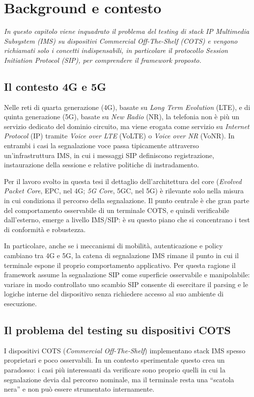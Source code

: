 \chapter{Background e contesto}
\begin{minipage}{12cm}\textit{In questo capitolo viene inquadrato il problema del testing di stack \emph{IP Multimedia Subsystem} (IMS) su dispositivi \emph{Commercial Off-The-Shelf} (COTS) e vengono richiamati solo i concetti indispensabili, in particolare il protocollo \emph{Session Initiation Protocol} (SIP), per comprendere il framework proposto.}\end{minipage}
\vspace*{1cm}

\section{Il contesto 4G e 5G}
Nelle reti di quarta generazione (4G), basate su \emph{Long Term Evolution} (LTE), e di quinta generazione (5G), basate su \emph{New Radio} (NR), la telefonia non \`e pi\`u un servizio dedicato del dominio circuito, ma viene erogata come servizio su \emph{Internet Protocol} (IP) tramite \emph{Voice over LTE} (VoLTE) o \emph{Voice over NR} (VoNR). In entrambi i casi la segnalazione voce passa tipicamente attraverso un'infrastruttura IMS, in cui i messaggi SIP definiscono registrazione, instaurazione della sessione e relative politiche di instradamento.

Per il lavoro svolto in questa tesi il dettaglio dell'architettura del core (\emph{Evolved Packet Core}, EPC, nel 4G; \emph{5G Core}, 5GC, nel 5G) \`e rilevante solo nella misura in cui condiziona il percorso della segnalazione. Il punto centrale \`e che gran parte del comportamento osservabile di un terminale COTS, e quindi verificabile dall'esterno, emerge a livello IMS/SIP: \`e su questo piano che si concentrano i test di conformit\`a e robustezza.

In particolare, anche se i meccanismi di mobilit\`a, autenticazione e policy cambiano tra 4G e 5G, la catena di segnalazione IMS rimane il punto in cui il terminale espone il proprio comportamento applicativo. Per questa ragione il framework assume la segnalazione SIP come superficie osservabile e manipolabile: variare in modo controllato uno scambio SIP consente di esercitare il parsing e le logiche interne del dispositivo senza richiedere accesso al suo ambiente di esecuzione.

\section{Il problema del testing su dispositivi COTS}
I dispositivi COTS (\emph{Commercial Off-The-Shelf}) implementano stack IMS spesso proprietari e poco osservabili. In un contesto sperimentale questo crea un paradosso: i casi pi\`u interessanti da verificare sono proprio quelli in cui la segnalazione devia dal percorso nominale, ma il terminale resta una ``scatola nera'' e non pu\`o essere strumentato internamente.

